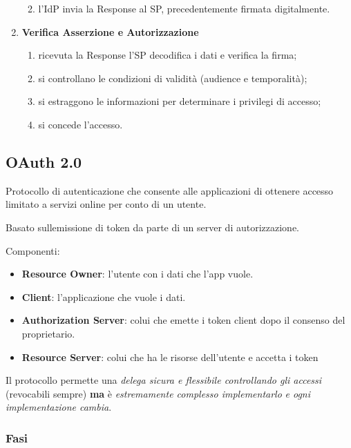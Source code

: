 \begin{enumerate}
  \begin{enumerate}
  \def\labelenumii{\alph{enumii}.}
  \item
    l'IdP invia la Response al SP, precedentemente firmata digitalmente.
  \end{enumerate}
\item
  \textbf{Verifica Asserzione e Autorizzazione}

  \begin{enumerate}
  \def\labelenumii{\alph{enumii}.}
  \item
    ricevuta la Response l'SP decodifica i dati e verifica la firma;
  \item
    si controllano le condizioni di validità (audience e temporalità);
  \item
    si estraggono le informazioni per determinare i privilegi di
    accesso;
  \item
    si concede l'accesso.
  \end{enumerate}
\end{enumerate}

\subsection{OAuth 2.0}\label{oauth-2.0}

Protocollo di autenticazione che consente alle applicazioni di ottenere
accesso limitato a servizi online per conto di un utente.

Basato sull\textquotesingle emissione di token da parte di un server di
autorizzazione.

Componenti:

\begin{itemize}
\item
  \textbf{Resource Owner}: l'utente con i dati che l'app vuole.
\item
  \textbf{Client}: l'applicazione che vuole i dati.
\item
  \textbf{Authorization Server}: colui che emette i token client dopo il
  consenso del proprietario.
\item
  \textbf{Resource Server}: colui che ha le risorse dell'utente e
  accetta i token
\end{itemize}

Il protocollo permette una \emph{delega sicura e flessibile controllando
gli accessi} (revocabili sempre) \textbf{ma} è \emph{estremamente
complesso implementarlo} \emph{e ogni implementazione cambia}.

\subsubsection{Fasi}\label{fasi-1}

